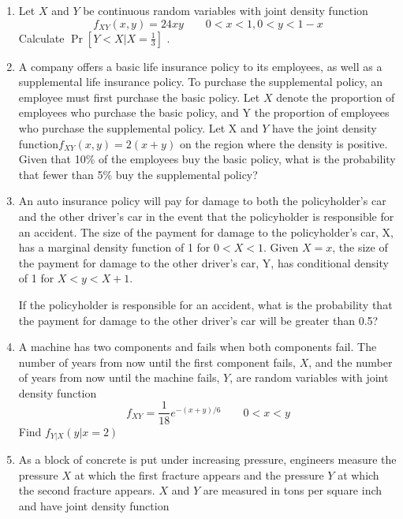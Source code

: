 \begin{exercises}
\begin{enumerate}
\item %

Let $X$ and $Y$ be continuous random variables with joint density function
$$f_{XY}(x,y) = 24xy \qquad 0<x<1, 0<y<1-x$$
Calculate $\Pr[ Y < X|X = \frac13]$ .





\item %
A company offers a basic life insurance policy to its employees, as well as a
supplemental life insurance policy. To purchase the supplemental policy, an
employee must first purchase the basic policy.
Let $X$ denote the proportion of employees who purchase the basic policy, and
Y the proportion of employees who purchase the supplemental policy. Let
X and $Y$ have the joint density function$ f_{XY}(x,y) = 2(x + y)$ on the region
where the density is positive.
Given that 10\% of the employees buy the basic policy, what is the probability
that fewer than 5\% buy the supplemental policy?



\item %
An auto insurance policy will pay for damage to both the policyholder’s car
and the other driver’s car in the event that the policyholder is responsible
for an accident. The size of the payment for damage to the policyholder’s
car, X, has a marginal density function of 1 for $0 < X < 1$. Given $X = x$, the
size of the payment for damage to the other driver’s car, Y, has conditional
density of 1 for $X < y < X + 1$.

If the policyholder is responsible for an accident, what is the probability that
the payment for damage to the other driver’s car will be greater than 0.5?



\item %
A machine has two components and fails when both components fail. The
number of years from now until the first component fails, $X$, and the number
of years from now until the machine fails, $Y$, are random variables with joint
density function
$$f_{XY} = \dfrac{1}{18}e^{-(x+y)/6} \qquad 0<x<y$$
Find $f_{Y |X}(y|x=2)$


\item %
As a block of concrete is put under increasing pressure, engineers measure the
pressure $X$ at which the first fracture appears and the pressure $Y$ at which
the second fracture appears. $X$ and $Y$ are measured in tons per square inch
and have joint density function


\end{enumerate}
\end{exercises}
